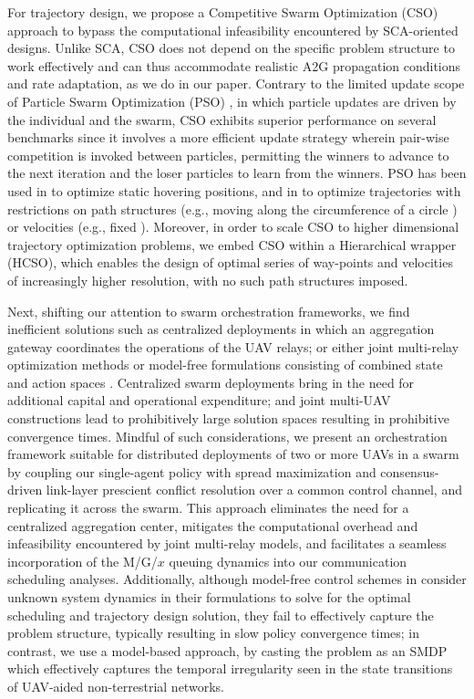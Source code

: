 \documentclass[10pt, twocolumn]{IEEEtran}
\theoremstyle{plain}
\theoremstyle{definition}
\theoremstyle{remark}
\begin{document}
For trajectory design, we propose a Competitive Swarm Optimization (CSO) \cite{CSO} approach to bypass the computational infeasibility encountered by SCA-oriented designs. Unlike SCA, CSO does not depend on the specific problem structure to work effectively and can thus accommodate realistic A2G propagation conditions and rate adaptation, as we do in our paper. Contrary to the limited update scope of Particle Swarm Optimization (PSO) \cite{PSO}, in which particle updates are driven by the individual and the swarm, CSO exhibits superior performance on several benchmarks \cite{CSO} since it involves a more efficient update strategy wherein pair-wise competition is invoked between particles, permitting the winners to advance to the next iteration and the loser particles to learn from the winners. PSO has been used in \cite{Efficient3DPlacementPSO, 3DDeploymentPSO} to optimize static hovering positions, and in \cite{PSOPathStructure,PAoI} to optimize trajectories with restrictions on path structures (e.g., moving along the circumference of a circle \cite{PSOPathStructure}) or velocities (e.g., fixed \cite{PAoI}). Moreover, in order to scale CSO to higher dimensional trajectory optimization problems, we embed CSO within a Hierarchical wrapper (HCSO), which enables the design of optimal series of way-points and velocities of increasingly higher resolution, with no such path structures imposed.

Next, shifting our attention to swarm orchestration frameworks, we find inefficient solutions such as centralized deployments \cite{JointTrajectoryDesign, MultiDroneDeployment, CSCA-ADMM} in which an aggregation gateway coordinates the operations of the UAV relays; or either joint multi-relay optimization methods \cite{CSCA-ADMM, GameTheory, UAVDynamicCoverage} or model-free formulations consisting of combined state and action spaces \cite{DDQN, MEC-DDPG, DQNPositioning, MLDeployment}. Centralized swarm deployments bring in the need for additional capital and operational expenditure; and joint multi-UAV constructions lead to prohibitively large solution spaces resulting in prohibitive convergence times. Mindful of such considerations, we present an orchestration framework suitable for distributed deployments of two or more UAVs in a swarm by coupling our single-agent policy with spread maximization and consensus-driven link-layer prescient conflict resolution over a common control channel, and replicating it across the swarm. This approach eliminates the need for a centralized aggregation center, mitigates the computational overhead and infeasibility encountered by joint multi-relay models, and facilitates a seamless incorporation of the M/G/$x$ queuing dynamics into our communication scheduling analyses. Additionally, although model-free control schemes in \cite{DDQN, MEC-DDPG, RLSenseSend, DQNPositioning, MLDeployment} consider unknown system dynamics in their formulations to solve for the optimal scheduling and trajectory design solution, they fail to effectively capture the problem structure, typically resulting in slow policy convergence times; in contrast, we use a model-based approach, by casting the problem as an SMDP which effectively captures the temporal irregularity seen in the state transitions of UAV-aided non-terrestrial networks.
\end{document}
